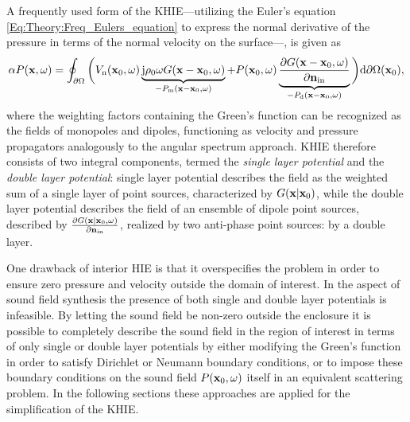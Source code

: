 A frequently used form of the KHIE---utilizing the Euler's equation \eqref{Eq:Theory:Freq_Eulers_equation} to express the normal derivative of the pressure in terms of the normal velocity on the surface---, is given as	
\begin{equation}
\alpha P(\mathbf{x},\omega) = 
\oint_{\partial \Omega}  \bigg(  
V_{\mathrm{n}}(\mathbf{x}_0,\omega) \underbrace{\mathrm{j} \rho_0 \omega  G(\mathbf{x}-\mathbf{x}_0,\omega) }_{-P_{\mathrm{m}}(\mathbf{x}-\mathbf{x}_0,\omega)}
+
P(\mathbf{x}_0,\omega)  \underbrace{\frac{\partial G(\mathbf{x}-\mathbf{x}_0,\omega)}{\partial \mathbf{n}_{\mathrm{in}}}}_{-P_{\mathrm{d}}(\mathbf{x}-\mathbf{x}_0,\omega)}
\bigg)   \mathrm{d} \partial \Omega(\mathbf{x}_0),
\label{Eq:Theory:Kirchhoff}
\end{equation}
where the weighting factors containing the Green's function can be recognized as the fields of monopoles and dipoles, functioning as velocity and pressure propagators analogously to the angular spectrum approach.
KHIE therefore consists of two integral components, termed the \emph{single layer potential} and the \emph{double layer potential}: single layer potential describes the field as the weighted sum of a single layer of point sources, characterized by $ G(\mathbf{x}|\mathbf{x}_0) $, while the double layer potential describes the field of an ensemble of dipole point sources, described by $\frac{\partial G(\mathbf{x}|\mathbf{x}_0,\omega)}{\partial \mathbf{n}_{\mathrm{in}}}$, realized by two anti-phase point sources: by a double layer.

One drawback of interior HIE is that it overspecifies the problem in order to ensure zero pressure and velocity outside the domain of interest. 
In the aspect of sound field synthesis the presence of both single and double layer potentials is infeasible.
By letting the sound field be non-zero outside the enclosure it is possible to completely describe the sound field in the region of interest in terms of only single or double layer potentials by either modifying the Green's function in order to satisfy Dirichlet or Neumann boundary conditions, or to impose these boundary conditions on the sound field $ P(\mathbf{x}_0,\omega)$ itself in an equivalent scattering problem.
In the following sections these approaches are applied for the simplification of the KHIE.
%
%


